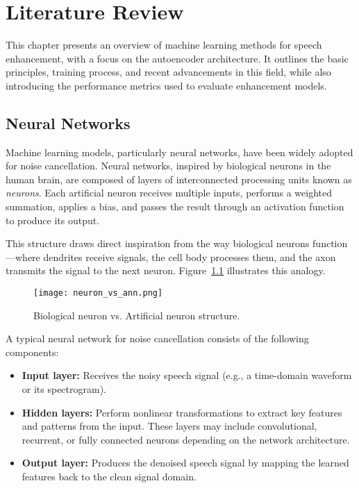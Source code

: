 \graphicspath{{content/chapters/3_literature/figures/}}
\chapter{Literature Review}
\label{sec:literature_review}

This chapter presents an overview of machine learning methods for speech enhancement, with a focus on the autoencoder architecture. It outlines the basic principles, training process, and recent advancements in this field, while also introducing the performance metrics used to evaluate enhancement models.


\section{Neural Networks}
\label{sec:neural_networks}

Machine learning models, particularly neural networks, have been widely adopted for noise cancellation. Neural networks, inspired by biological neurons in the human brain, are composed of layers of interconnected processing units known as \textit{neurons}. Each artificial neuron receives multiple inputs, performs a weighted summation, applies a bias, and passes the result through an activation function to produce its output.

This structure draws direct inspiration from the way biological neurons function—where dendrites receive signals, the cell body processes them, and the axon transmits the signal to the next neuron. Figure~\ref{fig:neuron_vs_ann} illustrates this analogy.

\begin{figure}[H]
    \centering
    \texttt{[image: neuron\_vs\_ann.png]}
    \caption{Biological neuron vs. Artificial neuron structure.\cite{ghosh2020perceptron}}
    \label{fig:neuron_vs_ann}
\end{figure}

A typical neural network for noise cancellation consists of the following components:
\begin{itemize}
    \item \textbf{Input layer:} Receives the noisy speech signal (e.g., a time-domain waveform or its spectrogram).
    \item \textbf{Hidden layers:} Perform nonlinear transformations to extract key features and patterns from the input. These layers may include convolutional, recurrent, or fully connected neurons depending on the network architecture.
    \item \textbf{Output layer:} Produces the denoised speech signal by mapping the learned features back to the clean signal domain.
\end{itemize}

